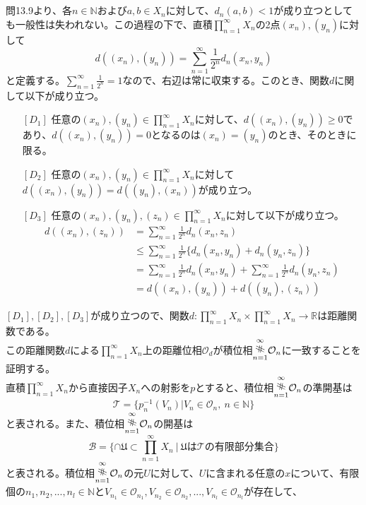 \documentclass{jsarticle}
\begin{document}
\subsection{}
問13.9より、各$n\in\mathbb{N}$および$a,b\in X_n$に対して、$d_n(a,b)<1$が成り立つとしても一般性は失われない。この過程の下で、直積$\prod_{n=1}^{\infty}X_n$の2点$(x_n),(y_n)$に対して
\[d((x_n),(y_n))=\sum_{n=1}^{\infty}\frac{1}{2^n}d_n(x_n,y_n)\]
と定義する。$\sum_{n=1}^{\infty}\frac{1}{2^n}=1$なので、右辺は常に収束する。このとき、関数$d$に関して以下が成り立つ。
\begin{enumerate}
\item[{$[D_1]$}]任意の$(x_n),(y_n)\in\prod_{n=1}^{\infty}X_n$に対して、$d((x_n),(y_n))\geq 0$であり、$d((x_n),(y_n))= 0$となるのは$(x_n)=(y_n)$のとき、そのときに限る。
\item[{$[D_2]$}]任意の$(x_n),(y_n)\in\prod_{n=1}^{\infty}X_n$に対して$d((x_n),(y_n))=d((y_n),(x_n))$が成り立つ。
\item[{$[D_3]$}]任意の$(x_n),(y_n),(z_n)\in\prod_{n=1}^{\infty}X_n$に対して以下が成り立つ。
\begin{align*}
d((x_n),(z_n))&=\sum_{n=1}^{\infty}\frac{1}{2^n}d_n(x_n,z_n)\\
&\leq \sum_{n=1}^{\infty}\frac{1}{2^n}\{d_n(x_n,y_n)+d_n(y_n,z_n)\}\\
&= \sum_{n=1}^{\infty}\frac{1}{2^n}d_n(x_n,y_n)+\sum_{n=1}^{\infty}\frac{1}{2^n}d_n(y_n,z_n)\\
&=d((x_n),(y_n))+d((y_n),(z_n))
\end{align*}
\end{enumerate}
$[D_1],[D_2],[D_3]$が成り立つので、関数$d:\prod_{n=1}^{\infty}X_n\times \prod_{n=1}^{\infty}X_n\to\mathbb{R}$は距離関数である。\\
この距離関数$d$による$\prod_{n=1}^{\infty}X_n$上の距離位相$\mathcal{O}_d$が積位相$\underset{n=1}{\overset{\infty}{\rotatebox{80}{\#}}}\mathcal{O}_n$に一致することを証明する。\\
直積$\prod_{n=1}^{\infty}X_n$から直接因子$X_n$への射影を$p$とすると、積位相$\underset{n=1}{\overset{\infty}{\rotatebox{80}{\#}}}\mathcal{O}_n$の準開基は
\[\mathcal{T}=\{p_n^{-1}(V_n)|V_n\in\mathcal{O}_n,\ n\in\mathbb{N}\}\]
と表される。また、積位相$\underset{n=1}{\overset{\infty}{\rotatebox{80}{\#}}}\mathcal{O}_n$の開基は
\[\mathcal{B}=\{\cap\mathfrak{U}\subset\prod_{n=1}^{\infty}X_n\ |\ \mathfrak{U}は\mathcal{T}の有限部分集合\}\]
と表される。積位相$\underset{n=1}{\overset{\infty}{\rotatebox{80}{\#}}}\mathcal{O}_n$の元$U$に対して、$U$に含まれる任意の$x$について、有限個の$n_1,n_2,...,n_l\in\mathbb{N}$と$V_{n_1}\in\mathcal{O}_{n_1},V_{n_2}\in\mathcal{O}_{n_2},...,V_{n_l}\in\mathcal{O}_{n_l}$が存在して、
\end{document}
